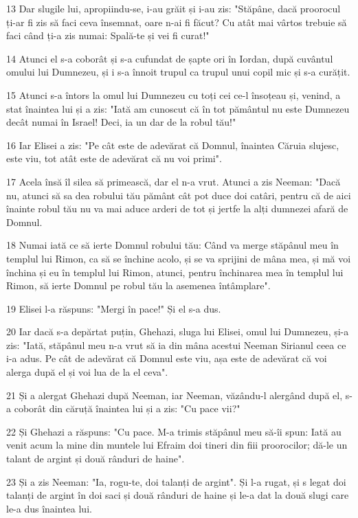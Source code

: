 \par 13 Dar slugile lui, apropiindu-se, i-au grăit și i-au zis: "Stăpâne, dacă proorocul ți-ar fi zis să faci ceva însemnat, oare n-ai fi făcut? Cu atât mai vârtos trebuie să faci când ți-a zis numai: Spală-te și vei fi curat!"
\par 14 Atunci el s-a coborât și s-a cufundat de șapte ori în Iordan, după cuvântul omului lui Dumnezeu, și i s-a înnoit trupul ca trupul unui copil mic și s-a curățit.
\par 15 Atunci s-a întors la omul lui Dumnezeu cu toți cei ce-l însoțeau și, venind, a stat înaintea lui și a zis: "Iată am cunoscut că în tot pământul nu este Dumnezeu decât numai în Israel! Deci, ia un dar de la robul tău!"
\par 16 Iar Elisei a zis: "Pe cât este de adevărat că Domnul, înaintea Căruia slujesc, este viu, tot atât este de adevărat că nu voi primi".
\par 17 Acela însă îl silea să primească, dar el n-a vrut. Atunci a zis Neeman: "Dacă nu, atunci să sa dea robului tău pământ cât pot duce doi catâri, pentru că de aici înainte robul tău nu va mai aduce arderi de tot și jertfe la alți dumnezei afară de Domnul.
\par 18 Numai iată ce să ierte Domnul robului tău: Când va merge stăpânul meu în templul lui Rimon, ca să se închine acolo, și se va sprijini de mâna mea, și mă voi închina și eu în templul lui Rimon, atunci, pentru închinarea mea în templul lui Rimon, să ierte Domnul pe robul tău la asemenea întâmplare".
\par 19 Elisei l-a răspuns: "Mergi în pace!" Și el s-a dus.
\par 20 Iar dacă s-a depărtat puțin, Ghehazi, sluga lui Elisei, omul lui Dumnezeu, și-a zis: "Iată, stăpânul meu n-a vrut să ia din mâna acestui Neeman Sirianul ceea ce i-a adus. Pe cât de adevărat că Domnul este viu, așa este de adevărat că voi alerga după el și voi lua de la el ceva".
\par 21 Și a alergat Ghehazi după Neeman, iar Neeman, văzându-l alergând după el, s-a coborât din căruță înaintea lui și a zis: "Cu pace vii?"
\par 22 Și Ghehazi a răspuns: "Cu pace. M-a trimis stăpânul meu să-îi spun: Iată au venit acum la mine din muntele lui Efraim doi tineri din fiii proorocilor; dă-le un talant de argint și două rânduri de haine".
\par 23 Și a zis Neeman: "Ia, rogu-te, doi talanți de argint". Și l-a rugat, și s legat doi talanți de argint în doi saci și două rânduri de haine și le-a dat la două slugi care le-a dus înaintea lui.

